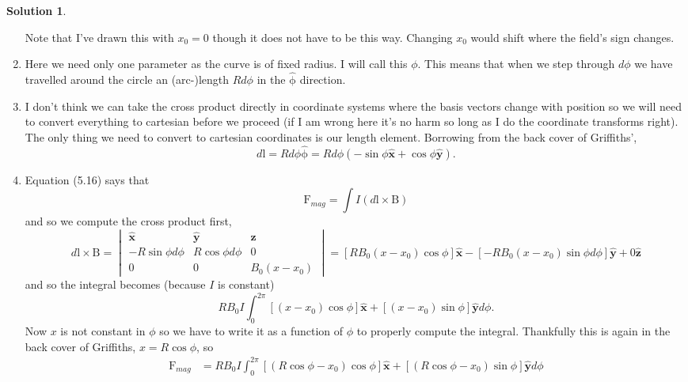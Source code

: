 \documentclass[10pt]{article}
\theoremstyle{definition}
\newtheorem{soln}{Solution}
\newcommand{\ux}{\hat{\mathbf{x}}}
\newcommand{\uy}{\hat{\mathbf{y}}}
\newcommand{\uz}{\hat{\mathbf{z}}}
\newcommand{\uv}[1]{\hat{\bv{{#1}}}}
\newcommand{\bv}[1]{\bm{\mathrm{#1}}}
\begin{document}
\begin{soln}
\begin{enumerate}[label=(\alph*)]
\begin{center}
          \end{center}
          Note that I've drawn this with $x_0=0$ though it does not have to be this way. Changing $x_0$ would shift where the field's sign changes.
    \item Here we need only one parameter as the curve is of fixed radius. I will call this $\phi$. This means that when we step through $d\phi$ we have travelled around the circle
          an (arc-)length $Rd\phi$ in the $\uv{\phi}$ direction.
    \item I don't think we can take the cross product directly in coordinate systems where the basis vectors change with position so we will need to convert everything
          to cartesian before we proceed (if I am wrong here it's no harm so long as I do the coordinate transforms right). The only thing we need to convert to cartesian coordinates
          is our length element. Borrowing from the back cover of Griffiths',
          $$d\bv{l}=Rd\phi\uv{\phi}=Rd\phi\left(-\sin\phi\ux+\cos\phi\uy\right).$$
    \item Equation (5.16) says that
          $$\bv{F}_{mag}=\int I \left(d\bv{l}\times \bv{B}\right)$$
          and so we compute the cross product first,
          $$
            d\bv{l}\times \bv{B}=\begin{vmatrix}
              \ux              & \uy             & \uz        \\
              -R\sin\phi d\phi & R\cos\phi d\phi & 0          \\
              0                & 0               & B_0(x-x_0)
            \end{vmatrix}=
            \left[RB_0(x-x_0)\cos\phi\right]\ux-\left[-RB_0(x-x_0)\sin\phi d\phi\right]\uy+0\uz
          $$
          and so the integral becomes (because $I$ is constant)
          $$RB_0 I\int_{0}^{2\pi}  \left[(x-x_0)\cos\phi\right]\ux+\left[(x-x_0)\sin\phi\right]\uy d\phi.$$
          Now $x$ is not constant in $\phi$ so we have to write it as a function of $\phi$ to properly compute the integral. Thankfully this is again in the back cover of
          Griffiths, $x=R\cos\phi$, so
          \begin{align*}
            \bv{F}_{mag} & =RB_0 I\int_{0}^{2\pi}  \left[(R\cos\phi-x_0)\cos\phi\right]\ux+\left[(R\cos\phi-x_0)\sin\phi\right]\uy d\phi            \\

\end{align*}
\end{enumerate}
\end{soln}
\end{document}
